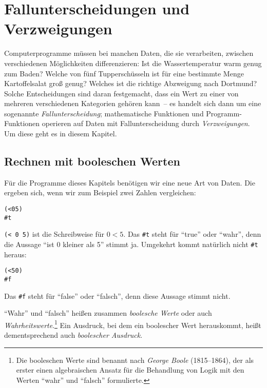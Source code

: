 
\chapter{Fallunterscheidungen und Verzweigungen}
\label{cha:conditionals}

Computerprogramme müssen bei manchen Daten, die sie
verarbeiten, zwischen verschiedenen Möglichkeiten differenzieren: Ist
die Wassertemperatur warm genug zum Baden?  Welche von fünf
Tupperschüsseln ist für eine bestimmte Menge Kartoffelsalat groß
genug?  Welches ist die richtige Abzweigung nach Dortmund?  Solche
Entscheidungen sind daran festgemacht, dass ein Wert zu einer von mehreren
verschiedenen 
Kategorien gehören kann~-- es handelt sich dann um eine sogenannte
\textit{Fallunterscheidung}; 
mathematische Funktionen und Programm-Funktionen operieren auf Daten mit
Fallunterscheidung durch \textit{Verzweigungen}.
Um diese geht es in diesem Kapitel.

\section{Rechnen mit booleschen Werten}

Für die Programme dieses Kapitels benötigen wir eine neue Art von
Daten.  Die ergeben sich, wenn wir zum Beispiel zwei Zahlen
vergleichen:
%
\begin{alltt}
(< 0 5)
\evalsto{} #t
\end{alltt}
%
\texttt{(< 0 5)} ist die Schreibweise für $0 < 5$.  Das
\verb|#t| steht für "`true"' oder "`wahr"',
denn die Aussage "`ist 0 kleiner als 5"' stimmt ja.
Umgekehrt kommt natürlich nicht \verb|#t| heraus:
%
\begin{alltt}
(< 5 0)
\evalsto{} #f
\end{alltt}
%
Das \verb|#f| steht für "`false"' oder
"`falsch"', denn diese Aussage stimmt nicht.

"`Wahr"' und "`falsch"' heißen zusammen \textit{boolesche
  Werte} oder auch
\textit{Wahrheitswerte}.\footnote{Die booleschen
  Werte sind benannt nach \textit{George Boole} (1815--1864), der als
  erster einen algebraischen Ansatz für die Behandlung von Logik mit
  den Werten "`wahr"' und "`falsch"' formulierte.}  Ein Ausdruck, bei
dem ein boolescher Wert herauskommt, heißt dementsprechend auch
\textit{boolescher Ausdruck}.

